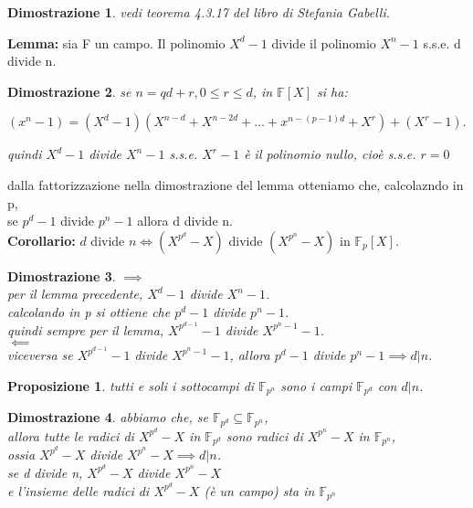 \documentclass[a4paper,12pt]{article}
\theoremstyle{def}
\theoremstyle{prop}
\newtheorem*{proposition}{Proposizione}
\theoremstyle{esempio}
\theoremstyle{dimostrazione}
\newtheorem*{dimostrazione}{Dimostrazione}
\theoremstyle{teo}
\theoremstyle{osservazione}
\begin{document}
\begin{dimostrazione}
    vedi teorema 4.3.17 del libro di Stefania Gabelli. 
\end{dimostrazione}

\textbf{Lemma:} sia F un campo. Il polinomio \(X^d - 1\) divide il polinomio \(X^n - 1\) s.s.e. d divide n.

\begin{dimostrazione}
    se \(n = qd + r, 0 \leq r \leq d\), in \(\mathbb{F}[X]\) si ha:
    \begin{center}
        \((x^n - 1) = (X^d - 1)(X^{n-d} + X^{n-2d} + ... + x^{n-(p-1)d} + X^r) + (X^r -1).\)\\
    \end{center}
    quindi \(X^d - 1\) divide \(X^n - 1\) s.s.e. \(X^r - 1\) è il polinomio nullo, cioè s.s.e. \(r = 0\)
\end{dimostrazione}

\vspace{\baselineskip}

dalla fattorizzazione nella dimostrazione del lemma otteniamo che, calcolazndo in p,\\
se \(p^d - 1\) divide \(p^n - 1\) allora d divide n.\\

\textbf{Corollario:} \(d\) divide \(n \iff (X^{p^d} - X)\) divide \((X^{p^n} - X)\) in \(\mathbb{F}_p[X]\).

\begin{dimostrazione}
    \(\implies\)\\
    per il lemma precedente, \(X^d - 1\) divide \(X^n - 1\).\\
    calcolando in p si ottiene che \(p^d - 1\) divide \(p^n - 1\).\\
    quindi sempre per il lemma, \(X^{p^{d - 1}} - 1\) divide \(X^{p^n - 1} - 1\).\\
    \(\impliedby\)\\
    viceversa se \(X^{p^{d - 1}} - 1\) divide \(X^{p^n -1 } - 1\), allora \(p^d - 1\) divide \(p^n - 1 \implies d | n\).\\
\end{dimostrazione}

\begin{proposition}
    tutti e soli i sottocampi di \(\mathbb{F}_{p^n}\) sono i campi \(\mathbb{F}_{p^d}\) con \(d | n\).
\end{proposition}

\begin{dimostrazione}
    abbiamo che, se \(\mathbb{F}_{p^d} \subseteq \mathbb{F}_{p^n}\),\\
    allora tutte le radici di \(X^{p^d} - X\) in \(\mathbb{F}_{p^d}\) sono radici di \(X^{p^n} - X\) in \(\mathbb{F}_{p^n}\),\\
    ossia \(X^{p^d} - X\) divide \(X^{p^n} - X \implies d | n\).\\
    se d divide n, \(X^{p^d} - X \) divide \(X^{p^n} - X\)\\
    e l'insieme delle radici di \(X^{p^d} - X\) (è un campo) sta in \(\mathbb{F}_{p^n}\)\\
\end{dimostrazione}
\end{document}

